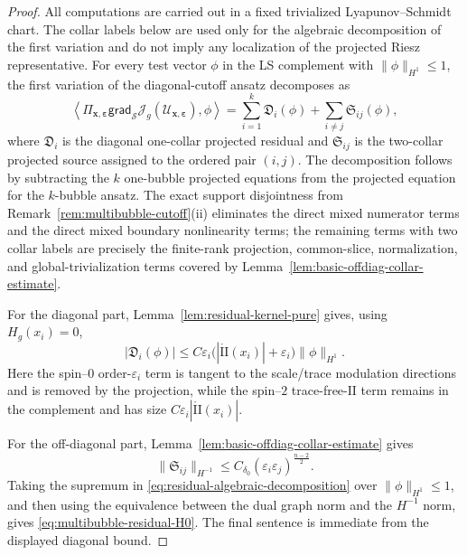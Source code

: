 \documentclass[11pt,reqno,a4paper]{amsart}
\numberwithin{equation}{section}
\theoremstyle{plain}
\theoremstyle{remark}
\theoremstyle{plain}
\begin{document}
\begin{proof}
All computations are carried out in a fixed trivialized Lyapunov--Schmidt chart. The collar labels below are used only for the algebraic decomposition of the first variation and do not imply any localization of the projected Riesz representative. For every test vector $\phi$ in the LS
complement with $\|\phi\|_{H^1}\le1$, the first variation of the diagonal-cutoff
ansatz decomposes as
\begin{equation}\label{eq:residual-algebraic-decomposition}
\left\langle
\Pi_{\mathbf x,\boldsymbol\varepsilon}
\mathsf{grad}_{\mathcal S}\mathcal J_g(\mathcal U_{\mathbf x,\boldsymbol\varepsilon}),
\phi
\right\rangle
=
\sum_{i=1}^k \mathfrak D_i(\phi)
+
\sum_{i\ne j}\mathfrak S_{ij}(\phi),
\end{equation}
where $\mathfrak D_i$ is the diagonal one-collar projected residual and
$\mathfrak S_{ij}$ is the two-collar projected source assigned to the ordered pair
$(i,j)$.  The decomposition follows by subtracting the $k$ one-bubble projected
equations from the projected equation for the $k$-bubble ansatz.  The exact
support disjointness from Remark~\ref{rem:multibubble-cutoff}\textup{(ii)}
eliminates the direct mixed numerator terms and the direct mixed boundary
nonlinearity terms; the remaining terms with two collar labels are precisely the
finite-rank projection, common-slice, normalization, and global-trivialization
terms covered by Lemma~\ref{lem:basic-offdiag-collar-estimate}.

For the diagonal part, Lemma~\ref{lem:residual-kernel-pure} gives, using
$H_g(x_i)=0$,
\[
|\mathfrak D_i(\phi)|
\le
C\varepsilon_i\bigl(|\mathring{\mathrm{II}}(x_i)|+\varepsilon_i\bigr)
\|\phi\|_{H^1}.
\]
Here the spin--$0$ order-$\varepsilon_i$ term is tangent to the scale/trace
modulation directions and is removed by the projection, while the spin--$2$
trace-free-$\mathrm{II}$ term remains in the complement and has size
$C\varepsilon_i|\mathring{\mathrm{II}}(x_i)|$.

For the off-diagonal part, Lemma~\ref{lem:basic-offdiag-collar-estimate} gives
\[
\|\mathfrak S_{ij}\|_{H^{-1}}
\le
C_{\delta_0}(\varepsilon_i\varepsilon_j)^{\frac{n-2}{2}}.
\]
Taking the supremum in \eqref{eq:residual-algebraic-decomposition} over
$\|\phi\|_{H^1}\le1$, and then using the equivalence between the dual graph norm
and the $H^{-1}$ norm, gives \eqref{eq:multibubble-residual-H0}.  The final
sentence is immediate from the displayed diagonal bound.
\end{proof}
\end{document}
